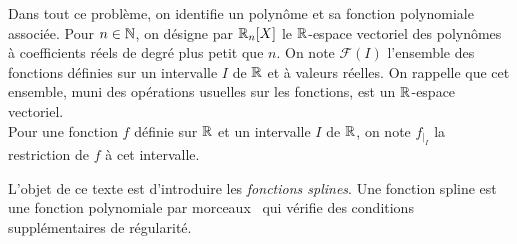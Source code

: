 

Dans tout ce problème, on identifie un polynôme et sa fonction polynomiale associée. Pour $n\in \mathbb{N}$, on désigne par $\mathbb{R}_n[X]$ le $\mathbb{R}$-espace vectoriel des polynômes à coefficients réels de degré plus petit que $n$. On note $\mathcal{F}(I)$ l'ensemble des fonctions définies sur un intervalle $I$ de $\mathbb{R}$ et à valeurs réelles. On rappelle que cet ensemble, muni des opérations usuelles sur les fonctions, est un $\mathbb{R}$-espace vectoriel. \\
Pour une fonction $f$ définie sur $\mathbb{R}$ et un intervalle $I$ de $\mathbb{R}$, on note $f_{|_{I}}$ la restriction de $f$ à cet intervalle.

L'objet de ce texte est d'introduire les \emph{fonctions splines}. Une fonction spline est une fonction \og polynomiale par morceaux\fg~ qui vérifie des conditions supplémentaires de régularité.

